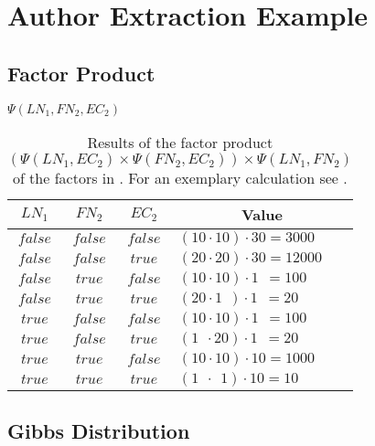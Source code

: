 \chapter{Author Extraction Example}\label{app:cha-author-extraction-example}
\section{Factor Product}\label{app:sec-factor-product}
\begin{table}[h!]
\centering
$\Psi(LN_1,FN_2,EC_2)$\par
\smallskip
\begin{tabular}{c c c l}
 \toprule
 $LN_1$ & $FN_2$ & $EC_2$ & \multicolumn{1}{c}{Value} \\
 \midrule
 $false$ & $false$ & $false$ & $(10\cdot10)\cdot30=3000$\\
 $false$ & $false$ & $true$  & $(20\cdot20)\cdot30=12000$\\
 $false$ & $true$  & $false$ & $(10\cdot10)\cdot1\ \ =100$\\
 $false$ & $true$  & $true$  & $(20\cdot1\ \ )\cdot1\ \ =20$\\
 $true$  & $false$ & $false$ & $(10\cdot10)\cdot1\ \ =100$\\
 $true$  & $false$ & $true$  & $(1\ \ \cdot20)\cdot1\ \ =20$\\
 $true$  & $true$  & $false$ & $(10\cdot10)\cdot10=1000$\\
 $true$  & $true$  & $true$  & $(1\ \ \cdot\ \ 1)\cdot10=10$\\
 \bottomrule
\end{tabular}
\caption{Results of the \gls{factor product} $(\Psi(LN_1,EC_2)\times\Psi(FN_2,EC_2))\times\Psi(LN_1,FN_2)$ of the \glspl{factor} in . For an exemplary calculation see .}
\label{tab:example-factor-product}
\end{table}
\section{Gibbs Distribution}\label{app:sec-gibbs-distribution}
